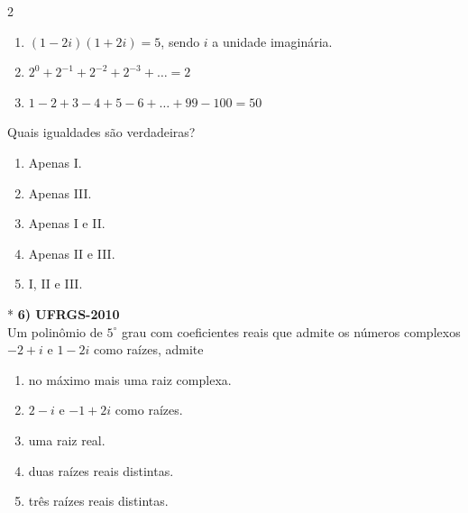 \documentclass[11pt,a4paper]{article}
\begin{document}
\begin{paracol}{2}
    \begin{enumerate}[label=\Roman*., itemsep=0.2cm]
        \item $(1 - 2i)(1 + 2i) = 5$, sendo $i$ a unidade imaginária.
        \item $2^0 + 2^{-1} + 2^{-2} + 2^{-3} + \dots = 2$
        \item $1 - 2 + 3 - 4 + 5 - 6 + \dots + 99 - 100 = 50$
    \end{enumerate}

    Quais igualdades são verdadeiras?

    \begin{enumerate}[label=(\Alph*)]
        \item Apenas I.
        \item Apenas III.
        \item Apenas I e II.
        \item Apenas II e III.
        \item I, II e III.
    \end{enumerate}
    \vspace{0.4cm}

    \switchcolumn[1]
    \vspace{8.5cm}

    \switchcolumn[0]*
    \textbf{6) UFRGS-2010} \\
    Um polinômio de $5^\circ$ grau com coeficientes reais que admite os números complexos $-2+i$ e $1-2i$ como raízes, admite

    \begin{enumerate}[label=(\Alph*)]
        \item no máximo mais uma raiz complexa.
        \item $2-i$ e $-1+2i$ como raízes.
        \item uma raiz real.
        \item duas raízes reais distintas.
        \item três raízes reais distintas.
    \end{enumerate}
    \vspace{0.4cm}

    \switchcolumn[1]
    \vspace{6cm}

\end{paracol}

\vspace{1cm}
\end{document}
